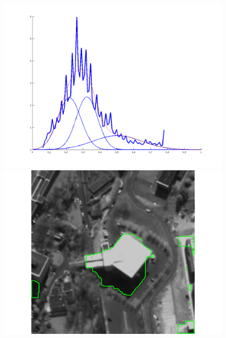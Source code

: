 \documentclass[compress]{beamer} %
\begin{document}
\begin{frame}
\begin{figure}[h!]
\begin{minipage}{0.27\linewidth}
    \end{minipage}
    \begin{minipage}{0.27\linewidth}
    \includegraphics[width=\linewidth]{back_hist}
    \end{minipage}
    \begin{minipage}{0.27\linewidth}
    \includegraphics[width=\linewidth]{result_1}
    \end{minipage}
    \begin{minipage}{0.27\linewidth}

\end{minipage}
\end{figure}
\end{frame}
\end{document}

